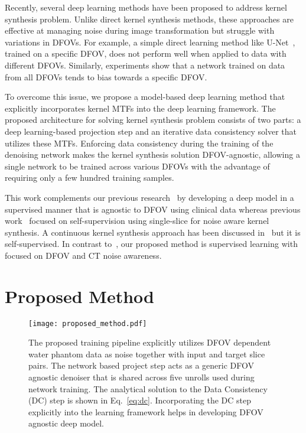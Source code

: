 \documentclass{article}
\begin{document}
Recently, several deep learning methods have been proposed to address kernel synthesis problem. Unlike direct kernel synthesis methods, these approaches are effective at managing noise during image transformation but struggle with variations in DFOVs. For example, a simple direct learning method like U-Net~\cite{unet}, trained on a specific DFOV, does not perform well when applied to data with different DFOVs. Similarly, experiments show that a network trained on data from all DFOVs tends to bias towards a specific DFOV.

To overcome this issue, we propose a model-based deep learning method that explicitly incorporates kernel MTFs into the deep learning framework. The proposed architecture for solving kernel synthesis problem consists of two parts: a deep learning-based projection step and an iterative data consistency solver that utilizes these MTFs. Enforcing data consistency during the training of the denoising network makes the kernel synthesis solution DFOV-agnostic, allowing a single network to be trained across various DFOVs with the advantage of requiring only a few hundred training samples. 

 
This work complements our previous research~\cite{aggarwal2024self} by developing a deep model in a supervised manner that is agnostic to DFOV  using clinical data whereas previous work~\cite{aggarwal2024self} focused on self-supervision using single-slice for noise aware kernel synthesis. A continuous kernel synthesis approach has been discussed in~\cite{jongContinuousConversion} but it is self-supervised. In contrast to~\cite{jongContinuousConversion}, our proposed method is supervised learning with focused on DFOV and CT noise awareness.

\section{Proposed Method}
\begin{figure}
	\centering
	\texttt{[image: proposed\_method.pdf]}	
	\caption{The proposed training pipeline explicitly utilizes DFOV dependent water phantom data as noise together with input and target slice pairs. The network based project step acts as a generic DFOV agnostic denoiser that is shared across five unrolls used during network training. The analytical solution to the Data Consistency (DC) step is shown in Eq.~\eqref{eq:dc}. Incorporating the DC step explicitly into the learning framework helps in developing  DFOV agnostic deep model.}
	\label{fig:proposed_method}
\end{figure}
\end{document}
